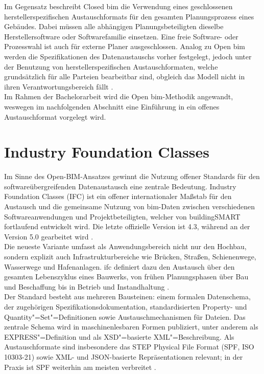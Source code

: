 Im Gegensatz beschreibt Closed \gls{bim} die Verwendung eines geschlossenen herstellerspezifischen Austauschformats für den gesamten Planungsprozess eines Gebäudes. 
Dabei müssen alle abhängigen Planungsbeteiligten dieselbe Herstellersoftware oder Softwarefamilie einsetzen. Eine freie Software- oder Prozesswahl ist auch für externe Planer ausgeschlossen.
Analog zu Open \gls{bim} werden die Spezifikationen des Datenaustauschs vorher festgelegt, jedoch unter der Benutzung von herstellerspezifischen Austauschformaten,
welche grundsätzlich für alle Parteien bearbeitbar sind, obgleich das Modell nicht in ihren Verantwortungsbereich fällt \cite{westphal2018openvsclosedbim}. \\

Im Rahmen der Bachelorarbeit wird die Open \gls{bim}-Methodik angewandt, weswegen im nachfolgenden Abschnitt eine Einführung in ein offenes Austauschformat vorgelegt wird.

\section{Industry Foundation Classes}
\label{sec:industry-foundation-classes}

Im Sinne des Open-BIM-Ansatzes gewinnt die Nutzung offener Standards für den softwareübergreifenden Datenaustausch eine zentrale Bedeutung. 
Industry Foundation Classes (IFC) ist ein offener internationaler Maßstab für den Austausch und die gemeinsame Nutzung von \gls{bim}-Daten zwischen verschiedenen Softwareanwendungen und Projektbeteiligten,
welcher von buildingSMART fortlaufend entwickelt wird. Die letzte offizielle Version ist 4.3, während an der Version 5.0 gearbeitet wird \cite{buildingsmart2025ifc4}. \\

Die neueste Variante umfasst als Anwendungsbereich nicht nur den Hochbau, sondern explizit auch Infrastrukturbereiche wie Brücken, Straßen, Schienenwege, Wasserwege und Hafenanlagen. 
\gls{ifc} definiert dazu den Austausch über den gesamten Lebenszyklus eines Bauwerks, von frühen Planungsphasen über Bau und Beschaffung bis in Betrieb und Instandhaltung \cite{buildingsmart2025ifc4}. \\

Der Standard besteht aus mehreren Bausteinen: einem formalen Datenschema, der zugehörigen Spezifikationsdokumentation, standardisierten Property- und Quantity"=Set"=Definitionen sowie Austauschmechanismen für Dateien. 
Das zentrale Schema wird in maschinenlesbaren Formen publiziert, unter anderem als EXPRESS"=Definition und als XSD"=basierte XML"=Beschreibung. 
Als Austauschformate sind insbesondere das STEP Physical File Format (SPF, ISO 10303-21) sowie XML- und JSON-basierte Repräsentationen relevant; in der Praxis ist SPF weiterhin am meisten verbreitet \cite{buildingsmart2025ifc4}. \\

